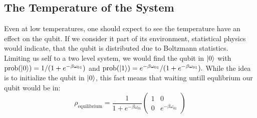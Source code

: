 \subsection{The Temperature of the System}
Even at low temperatures, one should expect to see the temperature have an effect on the qubit. If we consider it part of its environment, statistical physics would indicate, that the qubit is distributed due to Boltzmann statistics. Limiting us self to a two level system, we would find the qubit in $\ket{0}$ with $\text{prob}(\ket{0}) = 1 / (1 + e^{-\beta\omega_{01}})$ and $\text{prob}(\ket{1}) = e^{-\beta\omega_{01}} / (1 + e^{-\beta\omega_{01}}).$ While the idea is to initialize the qubit in $\ket{0}$, this fact means that waiting untill equlibrium our qubit would be in:
\begin{equation}\label{eq:equilibrium_qubit_density_matrix}
    \rho_{\text{equilibrium}} = \frac{1}{1 + e^{-\beta\omega_{01}}}\begin{pmatrix}
        1 & 0 \\
        0 & e^{-\beta\omega_{01}}
    \end{pmatrix}
\end{equation}

